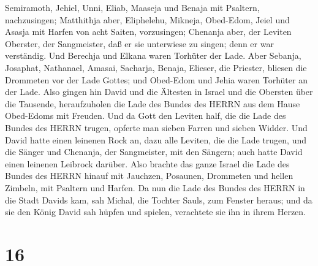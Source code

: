 Semiramoth, Jehiel, Unni, Eliab, Maaseja und Benaja mit Psaltern,
nachzusingen;  Matthithja aber, Eliphelehu, Mikneja,
Obed-Edom, Jeiel und Asasja mit Harfen von acht Saiten, vorzusingen;
 Chenanja aber, der Leviten Oberster, der Sangmeister, daß
er sie unterwiese zu singen; denn er war verständig.  Und
Berechja und Elkana waren Torhüter der Lade.  Aber Sebanja,
Josaphat, Nathanael, Amasai, Sacharja, Benaja, Elieser, die Priester,
bliesen die Drommeten vor der Lade Gottes; und Obed-Edom und Jehia waren
Torhüter an der Lade.  Also gingen hin David und die
Ältesten in Israel und die Obersten über die Tausende, heraufzuholen die
Lade des Bundes des HERRN aus dem Hause Obed-Edoms mit Freuden.
 Und da Gott den Leviten half, die die Lade des Bundes des
HERRN trugen, opferte man sieben Farren und sieben Widder. 
Und David hatte einen leinenen Rock an, dazu alle Leviten, die die Lade
trugen, und die Sänger und Chenanja, der Sangmeister, mit den Sängern;
auch hatte David einen leinenen Leibrock darüber.  Also
brachte das ganze Israel die Lade des Bundes des HERRN hinauf mit
Jauchzen, Posaunen, Drommeten und hellen Zimbeln, mit Psaltern und
Harfen.  Da nun die Lade des Bundes des HERRN in die Stadt
Davids kam, sah Michal, die Tochter Sauls, zum Fenster heraus; und da
sie den König David sah hüpfen und spielen, verachtete sie ihn in ihrem
Herzen.

\hypertarget{section-15}{%
\section{16}\label{section-15}}

